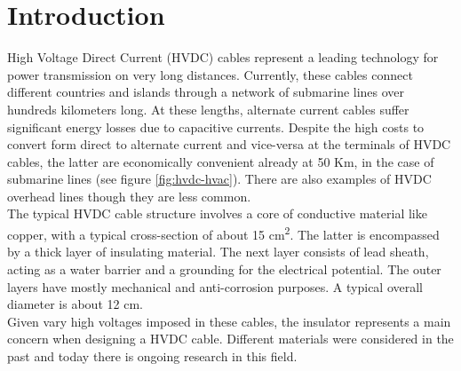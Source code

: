 \documentclass[11pt,a4paper]{article}
\begin{document}


\tableofcontents
\section{Introduction}
\label{sec:introduction}
High Voltage Direct Current (HVDC) cables represent a leading technology for power transmission on very long distances. Currently, these cables connect different countries and islands through a network of submarine lines over hundreds kilometers long. At these lengths, alternate current cables suffer significant energy losses due to capacitive currents. Despite the high costs to convert form direct to alternate current and vice-versa at the terminals of HVDC cables, the latter are economically convenient already at 50 Km, in the case of submarine lines (see figure \ref{fig:hvdc-hvac}). There are also examples of HVDC overhead lines though they are less common.\\
The typical HVDC cable structure involves a core of conductive material like copper, with a typical cross-section of about 15 cm\textsuperscript{2}. The latter is encompassed by a thick layer of insulating material. The next layer consists of lead sheath, acting as a water barrier and a grounding for the electrical potential. The outer layers have mostly mechanical and anti-corrosion purposes. A typical overall diameter is about 12 cm.\\
Given vary high voltages imposed in these cables, the insulator represents a main concern when designing a HVDC cable. Different materials were considered in the past and today there is ongoing research in this field.
\end{document}

